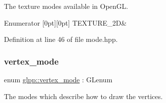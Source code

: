 The texture modes available in Open\+GL. 

\begin{DoxyEnumFields}{Enumerator}
[0pt][0pt]{}\mbox{\label{namespaceglpp_a09dd2630cf15f1c3f3b4164c59cc7d26acc301ce75e16247f3b96a3907519096c}} 
T\+E\+X\+T\+U\+R\+E\+\_\+2D&\\
\hline

\end{DoxyEnumFields}


Definition at line 46 of file mode.\+hpp.

\mbox{\label{namespaceglpp_a3d4cc897229caf80f6712debc078a265}} 
\subsubsection{\texorpdfstring{vertex\+\_\+mode}{vertex\_mode}}
{\footnotesize\ttfamily enum \hyperlink{namespaceglpp_a3d4cc897229caf80f6712debc078a265}{glpp\+::vertex\+\_\+mode} \+: G\+Lenum\hspace{0.3cm}{\ttfamily [strong]}}



The modes which describe how to draw the vertices. 

